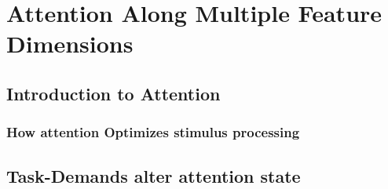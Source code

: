 
\chapter{Attention Along Multiple Feature Dimensions} %

\label{Chapter3} %


\newcommand{\keyword}[1]{\textbf{#1}}



\section{Introduction to Attention}
\subsection{How attention Optimizes stimulus processing}

\section{Task-Demands alter attention state}




 